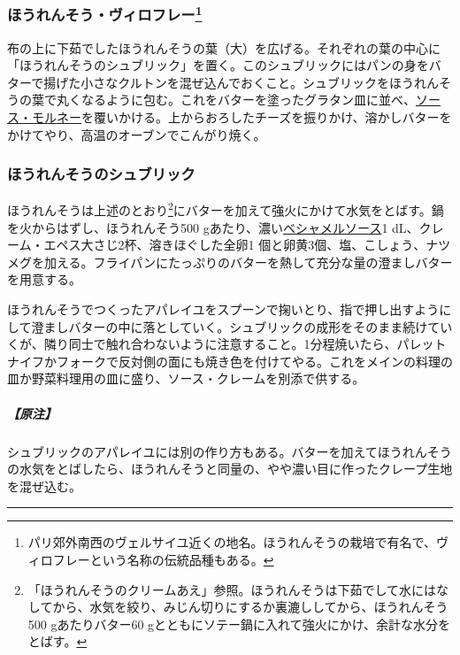 \begin{recette}
\hypertarget{epinards-a-la-viroflay}{%
\subsubsection[ほうれんそう・ヴィロフレー]{\texorpdfstring{ほうれんそう・ヴィロフレー\footnote{パリ郊外南西のヴェルサイユ近くの地名。ほうれんそうの栽培で有名で、ヴィロフレーという名称の伝統品種もある。}}{ほうれんそう・ヴィロフレー}}\label{epinards-a-la-viroflay}}


布の上に下茹でしたほうれんそうの葉（大）を広げる。それぞれの葉の中心に「ほうれんそうのシュブリック」を置く。このシュブリックにはパンの身をバターで揚げた小さなクルトンを混ぜ込んでおくこと。シュブリックをほうれんそうの葉で丸くなるように包む。これをバターを塗ったグラタン皿に並べ、\protect\hyperlink{sauce-mornay}{ソース・モルネー}を覆いかける。上からおろしたチーズを振りかけ、溶かしバターをかけてやり、高温のオーブンでこんがり焼く。

\hypertarget{subric-d-epinards}{%
\subsubsection{ほうれんそうのシュブリック}\label{subric-d-epinards}}


ほうれんそうは上述のとおり\footnote{「ほうれんそうのクリームあえ」参照。ほうれんそうは下茹でして水にはなしてから、水気を絞り、みじん切りにするか裏漉ししてから、ほうれんそう500
  gあたりバター60
  gとともにソテー鍋に入れて強火にかけ、余計な水分をとばす。}にバターを加えて強火にかけて水気をとばす。鍋を火からはずし、ほうれんそう500
gあたり、濃い\protect\hyperlink{sauce-bechamel}{ベシャメルソース}1
dL、クレーム・エペス大さじ2杯、溶きほぐした全卵1
個と卵黄3個、塩、こしょう、ナツメグを加える。フライパンにたっぷりのバターを熱して充分な量の澄ましバターを用意する。

ほうれんそうでつくったアパレイユをスプーンで掬いとり、指で押し出すようにして澄ましバターの中に落としていく。シュブリックの成形をそのまま続けていくが、隣り同士で触れ合わないように注意すること。1分程焼いたら、パレットナイフかフォークで反対側の面にも焼き色を付けてやる。これをメインの料理の皿か野菜料理用の皿に盛り、ソース・クレームを別添で供する。

\hypertarget{nota-subric-d-epinards}{%
\subparagraph{【原注】}\label{nota-subric-d-epinards}}

シュブリックのアパレイユには別の作り方もある。バターを加えてほうれんそうの水気をとばしたら、ほうれんそうと同量の、やや濃い目に作ったクレープ生地を混ぜ込む。
\end{recette}
\begin{center}\rule{0.5\linewidth}{\linethickness}\end{center}

